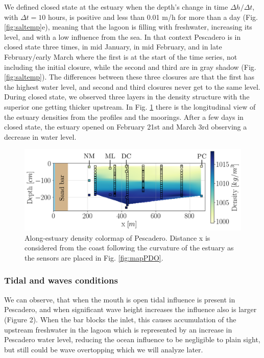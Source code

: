 \documentclass[11pt,letterpaper]{article}
\begin{document}
We defined closed state at the estuary when the depth’s change in time $\Delta h/\Delta t$, with $\Delta t=10$ hours, is positive and less than 0.01 m/h for more than a day (Fig. \ref{fig:saltemp}e), meaning that the lagoon is filling with freshwater, increasing its level, and with a low influence from the sea. In that context Pescadero is in closed state three times, in mid January, in mid February, and in late February/early March where the first is at the start of the time series, not including the initial closure, while the second and third are in gray shadow (Fig. \ref{fig:saltemp}). The differences between these three closures are that the first has the highest water level, and second and third closures never get to the same level. \\

During closed state, we observed three layers in the density structure with the superior one getting thicker upstream. In Fig. \ref{fig:perfiles1} there is the longitudinal view of the estuary densities from the profiles and the moorings. After a few days in closed state, the estuary opened on February 21st and March 3rd observing a decrease in water level. \\

\begin{figure}[h!]
    \centering
    \includegraphics[scale=0.6]{Imagenes/vista_long2.png}
    \caption{Along-estuary density colormap of Pescadero. Distance x is considered from the coast following the curvature of the estuary as the sensors are placed in Fig. \ref{fig:mapPDO}. }
    \label{fig:perfiles1}
\end{figure}

\subsubsection{Tidal and waves conditions}

We can observe, that when the mouth is open tidal influence is present in Pescadero, and when significant wave height increases the influence also is larger (Figure 2). When the bar blocks the inlet, this causes accumulation of the upstream freshwater in the lagoon which is represented by an increase in Pescadero water level, reducing the ocean influence to be negligible to plain sight, but still could be wave overtopping which we will analyze later.
\end{document}
